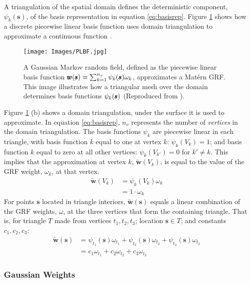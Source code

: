 A triangulation of the spatial domain defines the deterministic component, $\psi_{k}(\pmb{s})$, of the basis representation in equation \ref{eq:basisrep}. Figure \ref{fig:basis} shows how a discrete piecewise linear basis function uses domain triangulation to approximate a continuous function \citep{Simpson2012}.
  \begin{figure}[H]
	\centering
	\texttt{[image: Images/PLBF.jpg]}
	\caption{A Gaussian Markov random field, defined as the piecewise linear basis function $\pmb{w}(\pmb{s}) = \sum_{k=1}^{n_{v}} \protect\psi_{k}(\pmb{s})\protect\omega_{k}$, approximates a Mat\'ern GRF. This image illustrates how a triangular mesh over the domain determines basis functions $\protect\psi_{k}(\pmb{s})$ (Reproduced from \cite{Simpson2012}).}
	\label{fig:basis}
	\end{figure}
Figure \ref{fig:basis} (b) shows a domain triangulation, under the surface it is used to approximate. In equation \ref{eq:basisrep}, $n_{v}$ represents the number of {\it vertices} in the domain triangulation. The basis functions $\psi_{k}$ are piecewise linear in each triangle, with basis function $k$ equal to one at vertex $k$: $\psi_{k}(V_{k}) = 1$; and basis function $k$ equal to zero at all other vertices: $\psi_{k}(V_{k'}) = 0$ for $k'\neq k$. This implies that the approximation at vertex $k$, $\widetilde{\pmb{w}}(V_{k})$,  is equal to the value of the GRF weight, $\omega_{k}$, at that vertex.
\begin{align}
\widetilde{\pmb{w}}(V_{k}) &= \psi_{k}(V_{k}) \omega_{k} \\
&= 1 \cdot \omega_{k}
\end{align}
For points $\pmb{s}$ located in triangle interiors, $\widetilde{\pmb{w}}(\pmb{s})$ equals a linear combination of the GRF weights, $\omega$, at the three vertices that form the containing triangle. That is, for triangle $T$ made from vertices $t_{1}, t_{2}, t_{3}$; location $\pmb{s} \in T$; and constants $c_{1}, c_{2}, c_{3}$:
\begin{align}
\widetilde{\pmb{w}}(\pmb{s}) &= \psi_{t_{1}}(\pmb{s})\omega_{t_{1}} + \psi_{t_{2}}(\pmb{s})\omega_{t_{2}} 
+ \psi_{t_{2}}(\pmb{s})\omega_{t_{2}} \nonumber \\
&= c_{1}\omega_{t_{1}} + c_{2}\omega_{t_{2}} 
+ c_{3}\omega_{t_{2}} \nonumber
\end{align}

\subsubsection{Gaussian Weights} %

